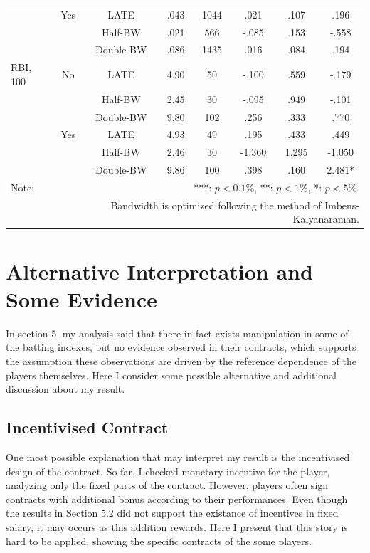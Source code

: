 \documentclass[dvipdfmx, 12pt]{article}
\begin{document}
\begin{table}[!]
\begin{tabular}{lccccccc}
    & Yes & LATE & .043 & 1044 & .021 & .107 & .196 \\
    & & Half-BW & .021 & 566 & -.085 & .153 & -.558 \\
    & &Double-BW & .086 & 1435 & .016 & .084 & .194 \\ \hline

    RBI, 100 & No & LATE & 4.90 & 50 & -.100 & .559 & -.179 \\
    & &Half-BW & 2.45 & 30 & -.095 & .949 & -.101 \\
    & &Double-BW & 9.80 & 102 & .256 & .333 & .770 \\ \cline{3-8}

    & Yes & LATE & 4.93 & 49 & .195 & .433 & .449 \\
    & & Half-BW & 2.46 & 30 & -1.360 & 1.295 & -1.050 \\
    & & Double-BW & 9.86 & 100 & .398 & .160 & 2.481* \\ \hline

    Note: & \multicolumn{7}{r}{***: $p<0.1\%$, **: $p<1\%$, *: $p<5\%$.} \\
    & \multicolumn{7}{r}{Bandwidth is optimized following the method of Imbens-Kalyanaraman.}
  \end{tabular}
\end{table}

\section{Alternative Interpretation and Some Evidence}

In section 5, my analysis said that there in fact exists manipulation in some of the batting indexes, but no evidence observed in their contracts, which supports the assumption these observations are driven by the reference dependence of the players themselves. Here I consider some possible alternative and additional discussion about my result.

\subsection{Incentivised Contract}

One most possible explanation that may interpret my result is the incentivised design of the contract. So far, I checked monetary incentive for the player, analyzing only the fixed parts of the contract. However, players often sign contracts with additional bonus according to their performances. Even though the results in Section 5.2 did not support the existance of incentives in fixed salary, it may occurs as this addition rewards. Here I present that this story is hard to be applied, showing the specific contracts of the some players.
\end{document}
